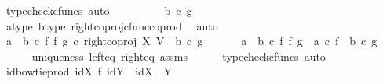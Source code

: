 \begin{isabellebody}
\ {\isacharparenleft}{\kern0pt}typecheck{\isacharunderscore}{\kern0pt}cfuncs{\isacharcomma}{\kern0pt}\ auto{\isacharparenright}{\kern0pt}\isanewline
\ \ \ \ \isamarkupfalse%
\ \isamarkupfalse%
\ {\isachardoublequoteopen}{\isachardot}{\kern0pt}{\isachardot}{\kern0pt}{\isachardot}{\kern0pt}\ {\isacharequal}{\kern0pt}\ {\isacharparenleft}{\kern0pt}b\ {\isasymcirc}\isactrlsub c\ g{\isacharparenright}{\kern0pt}{\isachardoublequoteclose}\isanewline
\ \ \ \ \ \ \isamarkupfalse%
\ a{\isacharunderscore}{\kern0pt}type\ b{\isacharunderscore}{\kern0pt}type\ right{\isacharunderscore}{\kern0pt}coproj{\isacharunderscore}{\kern0pt}cfunc{\isacharunderscore}{\kern0pt}coprod\ \isamarkupfalse%
\ auto\isanewline
\ \ \ \ \isamarkupfalse%
\ \isamarkupfalse%
\ {\isachardoublequoteopen}{\isacharparenleft}{\kern0pt}a\ {\isasymamalg}\ b\ {\isasymcirc}\isactrlsub c\ f\ {\isasymbowtie}\isactrlsub f\ g{\isacharparenright}{\kern0pt}\ {\isasymcirc}\isactrlsub c\ right{\isacharunderscore}{\kern0pt}coproj\ X\ V\ {\isacharequal}{\kern0pt}\ {\isacharparenleft}{\kern0pt}b\ {\isasymcirc}\isactrlsub c\ g{\isacharparenright}{\kern0pt}{\isachardoublequoteclose}\isacommand{{\isachardot}{\kern0pt}}\isamarkupfalse%
\isanewline
\ \ \isamarkupfalse%
\isanewline
\isanewline
\ \ \isamarkupfalse%
\ {\isachardoublequoteopen}{\isacharparenleft}{\kern0pt}a\ {\isasymamalg}\ b{\isacharparenright}{\kern0pt}\ {\isasymcirc}\isactrlsub c\ {\isacharparenleft}{\kern0pt}f\ {\isasymbowtie}\isactrlsub f\ g{\isacharparenright}{\kern0pt}\ {\isacharequal}{\kern0pt}\ {\isacharparenleft}{\kern0pt}a\ {\isasymcirc}\isactrlsub c\ f{\isacharparenright}{\kern0pt}\ {\isasymamalg}\ {\isacharparenleft}{\kern0pt}b\ {\isasymcirc}\isactrlsub c\ g{\isacharparenright}{\kern0pt}{\isachardoublequoteclose}\isanewline
\ \ \ \ \isamarkupfalse%
\ uniqueness\ left{\isacharunderscore}{\kern0pt}eq\ right{\isacharunderscore}{\kern0pt}eq\ assms\isanewline
\ \ \ \ \isamarkupfalse%
\ {\isacharparenleft}{\kern0pt}typecheck{\isacharunderscore}{\kern0pt}cfuncs{\isacharcomma}{\kern0pt}\ auto{\isacharparenright}{\kern0pt}\isanewline
{}\isamarkupfalse%
%
\endisatagproof
{\isafoldproof}%
%
\isadelimproof
\isanewline
%
\endisadelimproof
\isanewline
{}\isamarkupfalse%
\ id{\isacharunderscore}{\kern0pt}bowtie{\isacharunderscore}{\kern0pt}prod{\isacharcolon}{\kern0pt}\ {\isachardoublequoteopen}id{\isacharparenleft}{\kern0pt}X{\isacharparenright}{\kern0pt}\ {\isasymbowtie}\isactrlsub f\ id{\isacharparenleft}{\kern0pt}Y{\isacharparenright}{\kern0pt}\ {\isacharequal}{\kern0pt}\ id{\isacharparenleft}{\kern0pt}X\ {\isasymCoprod}\ Y{\isacharparenright}{\kern0pt}{\isachardoublequoteclose}\isanewline

\end{isabellebody}
